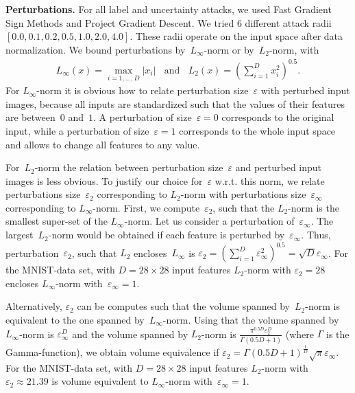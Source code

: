 \textbf{Perturbations.} For all label and uncertainty attacks, we used Fast Gradient Sign Methods and Project Gradient Descent. We tried 6 different attack radii $[0.0, 0.1, 0.2, 0.5, 1.0, 2.0, 4.0]$. These radii operate on the input space after data normalization. We bound perturbations by~$L_{\infty}$-norm or by~$L_2$-norm, with 
%
\begin{equation}
\begin{aligned}
	L_{\infty} (x) = \max_{i=1,\dots, D} \left|x_i\right| \mathrm{~~~~and~~~~}
	L_2 (x)        = (\sum_{i=1}^{D} x_i^2)^{0.5}.
\end{aligned}
\end{equation}
%
For $L_{\infty}$-norm it is obvious how to relate perturbation size~$\varepsilon$ with perturbed input images, because all inputs are standardized such that the values of their features are between~$0$ and~$1$.
A perturbation of size~$\varepsilon=0$ corresponds to the original input, while a perturbation of size~$\varepsilon=1$ corresponds to the whole input space and allows to change all features to any value. 

For~$L_2$-norm the relation between perturbation size~$\varepsilon$ and perturbed input images is less obvious. To justify our choice for~$\varepsilon$ w.r.t. this norm, we relate perturbations size~$\varepsilon_2$ corresponding to $L_2$-norm with perturbations size~$\varepsilon_{\infty}$ corresponding to $L_{\infty}$-norm. 
First, we compute~$\varepsilon_2$, such that the $L_2$-norm is the smallest super-set of the $L_{\infty}$-norm. Let us consider a perturbation of~$\varepsilon_{\infty}$. The largest~$L_2$-norm would be obtained if each feature is perturbed by~$\varepsilon_{\infty}$. Thus, perturbation~$\varepsilon_2$, such that $L_2$ encloses~$L_{\infty}$ is $\varepsilon_2 = (\sum_{i=1}^{D} \varepsilon_{\infty}^2)^{0.5} = \sqrt{D} \varepsilon_{\infty}$. For the MNIST-data set, with $D=28 \times 28$ input features $L_2$-norm with $\varepsilon_2=28$ encloses $L_{\infty}$-norm with~$\varepsilon_{\infty}=1$. 

Alternatively, $\varepsilon_2$ can be computes such that the volume spanned by~$L_2$-norm is equivalent to the one spanned by~$L_{\infty}$-norm. Using that the volume spanned by $L_{\infty}$-norm is $\varepsilon_{\infty}^D$ and the volume spanned by $L_2$-norm is 
$\frac{\pi^{0.5 D} \varepsilon_2^D}{\Gamma(0.5 D +1)}$ (where $\Gamma$ is the Gamma-function), we obtain volume equivalence if 
$\varepsilon_2 = \Gamma(0.5 D +1)^{\frac{1}{D}} \sqrt{\pi} \varepsilon_{\infty}$. For the MNIST-data set, with $D=28 \times 28$ input features $L_2$-norm with $\varepsilon_2 \approx 21.39$ is volume equivalent to $L_{\infty}$-norm with~$\varepsilon_{\infty}=1$.











